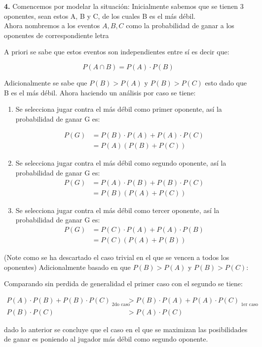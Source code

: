 \documentclass[a4paper,12pt]{article}
\begin{document}
	\newpage		%

	\textbf{4.}	Comencemos por modelar la situación: Inicialmente sabemos que se tienen 3 oponentes, sean estos
	A, B y C, de los cuales B es el más débil.\\

	Ahora nombremos a los eventos $A, B, C$ como la probabilidad de ganar a los oponentes de correspondiente letra 

	A priori se sabe que estos eventos son independientes entre sí es decir que:

	\begin{equation*}
		P(A\cap B) = P(A) \cdot P(B) 
	\end{equation*}

	Adicionalmente se sabe que $P(B) > P(A)$ y  $P(B) > P(C)$ esto dado que B es el más débil.
	Ahora haciendo un análisis por caso se tiene:


	\begin{enumerate}
		\item Se selecciona jugar contra el más débil como primer oponente, así la probabilidad de ganar G es:

			\begin{align*}
				P(G) &= P(B)\cdot P(A) + P(A)\cdot P(C)\\
				&= P(A)(P(B) + P(C))
			\end{align*}

		\item Se selecciona jugar contra el más débil como segundo oponente, así la probabilidad de ganar G es:
			\begin{align*}
				P(G) &= P(A)\cdot P(B) + P(B)\cdot P(C)\\
				&= P(B)(P(A) + P(C))
			\end{align*}

		\item Se selecciona jugar contra el más débil como tercer oponente, así la probabilidad de ganar G es:
			\begin{align*}
				P(G) &= P(C)\cdot P(A) + P(A)\cdot P(B)\\
				&= P(C)(P(A) + P(B))
			\end{align*}
	\end{enumerate}

	(Note como se ha descartado el caso trivial en el que se vencen a todos los oponentes)
	Adicionalmente basado en que $P(B) > P(A)$ y  $P(B) > P(C)$:

	Comparando sin perdida de generalidad el primer caso con el segundo se tiene:

	\begin{align*}
			P(A)\cdot P(B) + P(B)\cdot P(C)_{\text{    2do caso}}	&> P(B)\cdot P(A) + P(A)\cdot P(C)_{\text{  1er caso}}\\
			P(B)\cdot P(C) &> P(A)\cdot P(C)
	\end{align*}

	dado lo anterior se concluye que el caso en el que se maximizan las posibilidades de ganar es poniendo 
	al jugador más débil como segundo oponente.
\end{document}
